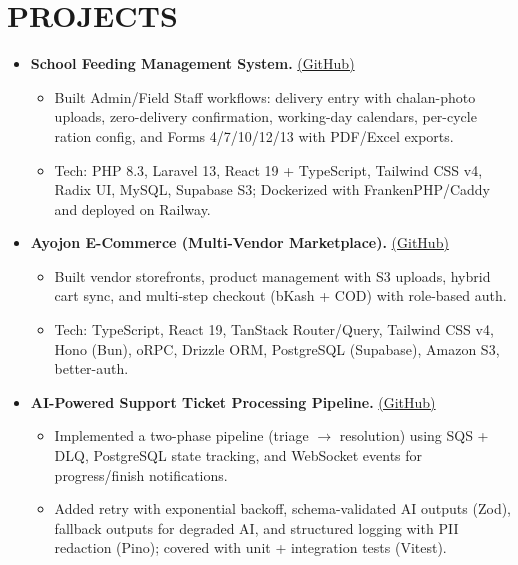 \documentclass[10pt]{article} %
\newenvironment{rSection}[1]{
  \section*{#1}
}{
  \vspace{-5pt}
}
\begin{document}
\begin{rSection}{PROJECTS}
\vspace{10pt}

\begin{itemize}[label=$\bullet$, itemsep=4pt, parsep=0pt, leftmargin=15pt]
    \item \textbf{School Feeding Management System.} \href{https://github.com/khalludi03/School-Feeding-Management-System-}{(GitHub)}
    \begin{itemize}[label=$\circ$, itemsep=0pt, parsep=0pt, leftmargin=10pt]
        \item Built Admin/Field Staff workflows: delivery entry with chalan-photo uploads, zero-delivery confirmation, working-day calendars, per-cycle ration config, and Forms 4/7/10/12/13 with PDF/Excel exports.
        \item Tech: PHP 8.3, Laravel 13, React 19 + TypeScript, Tailwind CSS v4, Radix UI, MySQL, Supabase S3; Dockerized with FrankenPHP/Caddy and deployed on Railway.
    \end{itemize}

    \item \textbf{Ayojon E-Commerce (Multi-Vendor Marketplace).} \href{https://github.com/khalludi03/Ayojon}{(GitHub)}
    \begin{itemize}[label=$\circ$, itemsep=0pt, parsep=0pt, leftmargin=10pt]
        \item Built vendor storefronts, product management with S3 uploads, hybrid cart sync, and multi-step checkout (bKash + COD) with role-based auth.
        \item Tech: TypeScript, React 19, TanStack Router/Query, Tailwind CSS v4, Hono (Bun), oRPC, Drizzle ORM, PostgreSQL (Supabase), Amazon S3, better-auth.
    \end{itemize}

    \item \textbf{AI-Powered Support Ticket Processing Pipeline.} \href{https://github.com/khalludi03/Ticket-Processing-Pipeline}{(GitHub)}
    \begin{itemize}[label=$\circ$, itemsep=0pt, parsep=0pt, leftmargin=10pt]
        \item Implemented a two-phase pipeline (triage $\rightarrow$ resolution) using SQS + DLQ, PostgreSQL state tracking, and WebSocket events for progress/finish notifications.
        \item Added retry with exponential backoff, schema-validated AI outputs (Zod), fallback outputs for degraded AI, and structured logging with PII redaction (Pino); covered with unit + integration tests (Vitest).
    \end{itemize}

\end{itemize}

\end{rSection}
\end{document}

